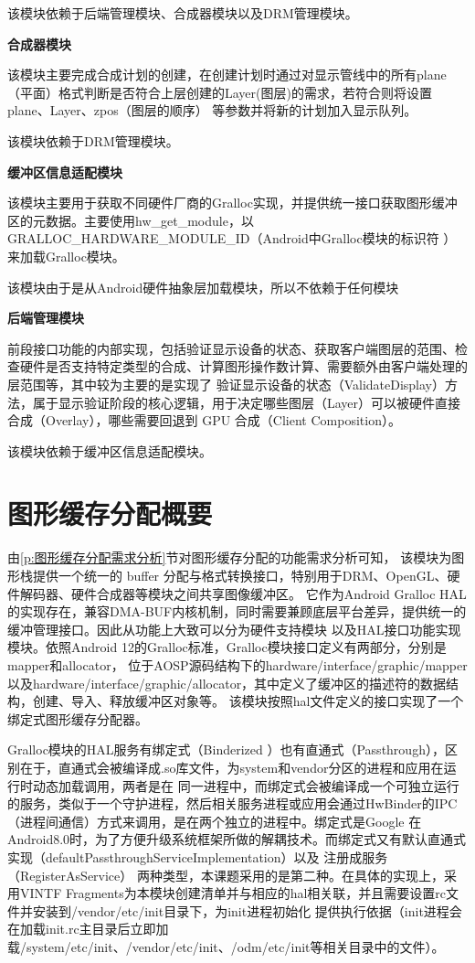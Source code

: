 该模块依赖于后端管理模块、合成器模块以及DRM管理模块。

\textbf{合成器模块}

该模块主要完成合成计划的创建，在创建计划时通过对显示管线中的所有plane（平面）格式判断是否符合上层创建的Layer(图层)的需求，若符合则将设置plane、Layer、zpos（图层的顺序）
等参数并将新的计划加入显示队列。

该模块依赖于DRM管理模块。

\textbf{缓冲区信息适配模块}

该模块主要用于获取不同硬件厂商的Gralloc实现，并提供统一接口获取图形缓冲区的元数据。主要使用hw\_get\_module，以GRALLOC\_HARDWARE\_MODULE\_ID（Android中Gralloc模块的标识符
）来加载Gralloc模块。

该模块由于是从Android硬件抽象层加载模块，所以不依赖于任何模块

\textbf{后端管理模块}

前段接口功能的内部实现，包括验证显示设备的状态、获取客户端图层的范围、检查硬件是否支持特定类型的合成、计算图形操作数计算、需要额外由客户端处理的层范围等，其中较为主要的是实现了
验证显示设备的状态（ValidateDisplay）方法，属于显示验证阶段的核心逻辑，用于决定哪些图层（Layer）可以被硬件直接合成（Overlay），哪些需要回退到 GPU 合成（Client Composition）。

该模块依赖于缓冲区信息适配模块。

\section{图形缓存分配概要}
由\ref{p:图形缓存分配需求分析}节对图形缓存分配的功能需求分析可知，
该模块为图形栈提供一个统一的 buffer 分配与格式转换接口，特别用于DRM、OpenGL、硬件解码器、硬件合成器等模块之间共享图像缓冲区。
它作为Android Gralloc HAL的实现存在，兼容DMA-BUF内核机制，同时需要兼顾底层平台差异，提供统一的缓冲管理接口。因此从功能上大致可以分为硬件支持模块
以及HAL接口功能实现模块。依照Android 12的Gralloc标准，Gralloc模块接口定义有两部分，分别是mapper和allocator，
位于AOSP源码结构下的hardware/interface/graphic/mapper以及hardware/interface/graphic/allocator，其中定义了缓冲区的描述符的数据结构，创建、导入、释放缓冲区对象等。
该模块按照hal文件定义的接口实现了一个绑定式图形缓存分配器。

Gralloc模块的HAL服务有绑定式（Binderized ）也有直通式（Passthrough），区别在于，直通式会被编译成.so库文件，为system和vendor分区的进程和应用在运行时动态加载调用，两者是在
同一进程中，而绑定式会被编译成一个可独立运行的服务，类似于一个守护进程，然后相关服务进程或应用会通过HwBinder的IPC（进程间通信）方式来调用，是在两个独立的进程中。绑定式是Google
在Android8.0时，为了方便升级系统框架所做的解耦技术。而绑定式又有默认直通式实现（defaultPassthroughServiceImplementation）以及 注册成服务（RegisterAsService）
两种类型，本课题采用的是第二种。在具体的实现上，采用VINTF Fragments为本模块创建清单并与相应的hal相关联，并且需要设置rc文件并安装到/vendor/etc/init目录下，为init进程初始化
提供执行依据（init进程会在加载init.rc主目录后立即加载/system/etc/init、/vendor/etc/init、/odm/etc/init等相关目录中的文件）。

